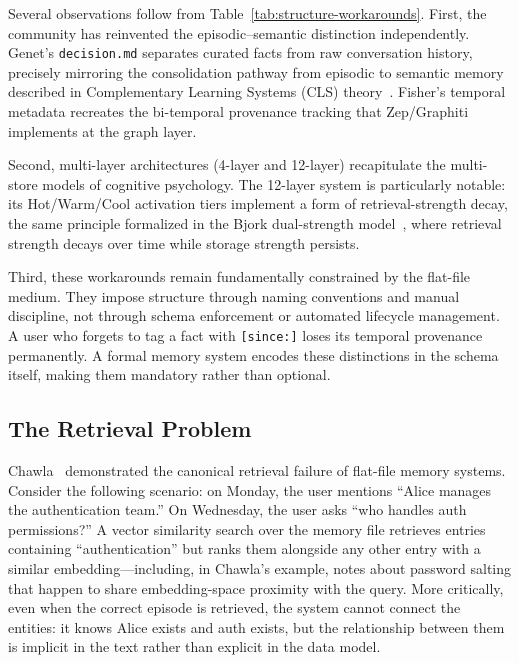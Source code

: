 Several observations follow from Table~\ref{tab:structure-workarounds}.
First, the community has reinvented the episodic--semantic distinction
independently.  Genet's \texttt{decision.md} separates curated facts
from raw conversation history, precisely mirroring the consolidation
pathway from episodic to semantic memory described in Complementary
Learning Systems (CLS) theory~\cite{mcclelland1995}.  Fisher's temporal
metadata recreates the bi-temporal provenance tracking that
Zep/Graphiti~\cite{dempsey2025graphiti} implements at the graph layer.

Second, multi-layer architectures (4-layer and 12-layer) recapitulate
the multi-store models of cognitive psychology.  The 12-layer system is
particularly notable: its Hot/Warm/Cool activation tiers implement a
form of retrieval-strength decay, the same principle formalized in the
Bjork dual-strength model~\cite{bjork1992}, where retrieval strength
decays over time while storage strength persists.

Third, these workarounds remain fundamentally constrained by the
flat-file medium.  They impose structure through naming conventions and
manual discipline, not through schema enforcement or automated
lifecycle management.  A user who forgets to tag a fact with
\texttt{[since:]} loses its temporal provenance permanently.  A formal
memory system encodes these distinctions in the schema itself, making
them mandatory rather than optional.

\subsection{The Retrieval Problem}
\label{sec:memorymd-retrieval}

Chawla~\cite{chawla2026} demonstrated the canonical retrieval failure
of flat-file memory systems.  Consider the following scenario: on Monday,
the user mentions ``Alice manages the authentication team.''  On
Wednesday, the user asks ``who handles auth permissions?''  A vector
similarity search over the memory file retrieves entries containing
``authentication'' but ranks them alongside any other entry with a
similar embedding---including, in Chawla's example, notes about
password salting that happen to share embedding-space proximity with the
query.  More critically, even when the correct episode is retrieved, the
system cannot connect the entities: it knows Alice exists and auth
exists, but the relationship between them is implicit in the text rather
than explicit in the data model.

